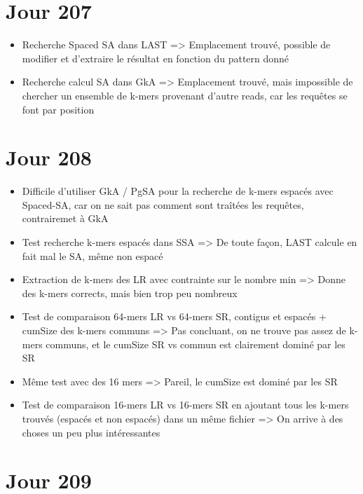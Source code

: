 \documentclass[12pt]{report}
\begin{document}
\section{Jour 207}

\begin{itemize}
	\item Recherche Spaced SA dans LAST => Emplacement trouvé, possible de modifier et d'extraire le résultat en fonction du pattern donné
	
	\item Recherche calcul SA dans GkA => Emplacement trouvé, mais impossible de chercher un ensemble de k-mers provenant d'autre reads, car les
		  requêtes se font par position
\end{itemize}

\section{Jour 208}

\begin{itemize}
	\item Difficile d'utiliser GkA / PgSA pour la recherche de k-mers espacés avec Spaced-SA, car on ne sait pas comment
		  sont traîtées les requêtes, contrairemet à GkA
		  
	\item Test recherche k-mers espacés dans SSA => De toute façon, LAST calcule en fait mal le SA, même non espacé

	\item Extraction de k-mers des LR avec contrainte sur le nombre min => Donne des k-mers corrects, mais bien trop peu nombreux
	
	\item Test de comparaison 64-mers LR vs 64-mers SR, contigus et espacés + cumSize des k-mers communs
		  => Pas concluant, on ne trouve pas assez de k-mers communs, et le cumSize SR vs commun est clairement dominé par les SR
		  
	\item Même test avec des 16 mers => Pareil, le cumSize est dominé par les SR
	
	\item Test de comparaison 16-mers LR vs 16-mers SR en ajoutant tous les k-mers trouvés (espacés et non espacés) dans un même fichier
		  => On arrive à des choses un peu plus intéressantes
\end{itemize}

\section{Jour 209}
\end{document}
